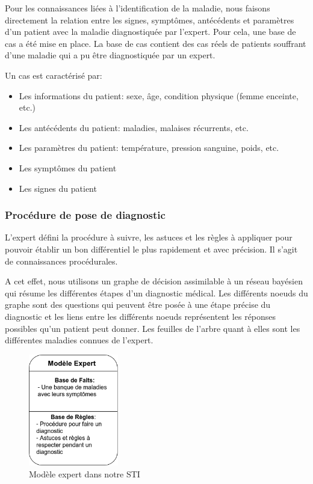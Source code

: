     Pour les connaissances liées à l'identification de la maladie, nous faisons directement la relation entre les signes, symptômes, antécédents et paramètres d'un patient avec la maladie diagnostiquée par l'expert. Pour cela, une base de cas a été mise en place. La base de cas contient des cas réels de patients souffrant d'une maladie qui a pu être diagnostiquée par un expert.
    
    Un cas est caractérisé par:
    \begin{itemize}
        \item Les informations du patient: sexe, âge, condition physique (femme enceinte, etc.)
        \item Les antécédents du patient: maladies, malaises récurrents, etc.
        \item Les paramètres du patient: température, pression sanguine, poids, etc.
        \item Les symptômes du patient
        \item Les signes du patient
    \end{itemize}
    
    
    \subsubsection{Procédure de pose de diagnostic}
    L'expert défini la procédure à suivre, les astuces et les règles à appliquer pour pouvoir établir un bon différentiel le plus rapidement et avec précision. Il s'agit de connaissances procédurales.
    
    A cet effet, nous utilisons un graphe de décision assimilable à un réseau bayésien qui résume les différentes étapes d'un diagnostic médical.
    Les différents noeuds du graphe sont des questions qui peuvent être posée à une étape précise du diagnostic et les liens entre les différents noeuds représentent les réponses possibles qu'un patient peut donner. Les feuilles de l'arbre quant à elles sont les différentes maladies connues de l'expert.
    
    \begin{figure}[H]
        \centering
        \includegraphics[width=0.35\textwidth]{figures/concept_expert.png}
        \captionsetup{justification=centering}
        \caption{Modèle expert dans notre STI}
        \label{fig:3}
    \end{figure}
    
